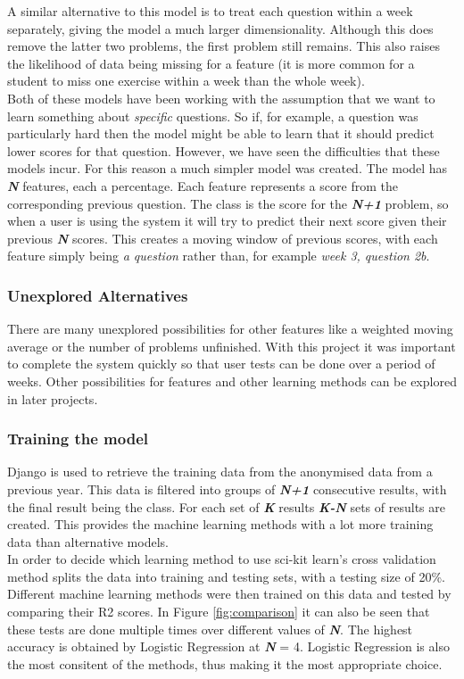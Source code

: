 A similar alternative to this model is to treat each question within a week separately, giving the model a much larger dimensionality. Although this does remove the latter two problems, the first problem still remains. This also raises the likelihood of data being missing for a feature (it is more common for a student to miss one exercise within a week than the whole week).
\\
Both of these models have been working with the assumption that we want to learn something about \emph{specific} questions. So if, for example, a question was particularly hard then the model might be able to learn that it should predict lower scores for that question. However, we have seen the difficulties that these models incur. For this reason a much simpler model was created. The model has \textit{\textbf{N}} features, each a percentage. Each feature represents a score from the corresponding previous question. The class is the score for the \textit{\textbf{N+1}} problem, so when a user is using the system it will try to predict their next score given their previous \textit{\textbf{N}} scores. This creates a moving window of previous scores, with each feature simply being \emph{a question} rather than, for example \emph{week 3, question 2b}.

\subsubsection{Unexplored Alternatives}
There are many unexplored possibilities for other features like a weighted moving average or the number of problems unfinished. With this project it was important to complete the system quickly so that user tests can be done over a period of weeks. Other possibilities for features and other learning methods can be explored in later projects.

\subsubsection{Training the model}
Django is used to retrieve the training data from the anonymised data from a previous year. This data is filtered into groups of \textit{\textbf{N+1}} consecutive results, with the final result being the class. For each set of \textit{\textbf{K}} results \textit{\textbf{K-N}} sets of results are created. This provides the machine learning methods with a lot more training data than alternative models.
\\%
In order to decide which learning method to use sci-kit learn's cross validation method splits the data into training and testing sets, with a testing size of 20\%. Different machine learning methods were then trained on this data and tested by comparing their R2 scores. In Figure \ref{fig:comparison} it can also be seen that these tests are done multiple times over different values of \textit{\textbf{N}}. The highest accuracy is obtained by Logistic Regression at \textit{\textbf{N}} = 4. Logistic Regression is also the most consitent of the methods, thus making it the most appropriate choice.

